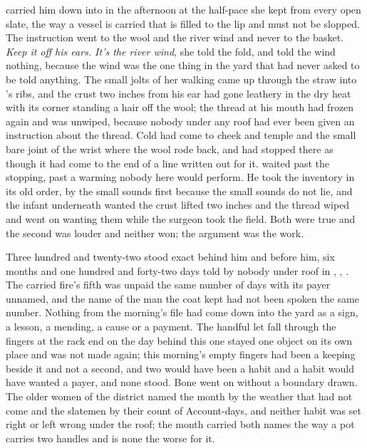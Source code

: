  carried him down into  in the afternoon at the half-pace she kept from every open slate, the way a vessel is carried that is filled to the lip and must not be slopped. The instruction went to the wool and the river wind and never to the basket. \emph{Keep it off his ears. It's the river wind}, she told the fold, and told the wind nothing, because the wind was the one thing in the yard that had never asked to be told anything. The small jolts of her walking came up through the straw into 's ribs, and the crust two inches from his ear had gone leathery in the dry heat with its corner standing a hair off the wool; the thread at his mouth had frozen again and was unwiped, because nobody under any roof had ever been given an instruction about the thread. Cold had come to cheek and temple and the small bare joint of the wrist where the wool rode back, and had stopped there as though it had come to the end of a line written out for it.  waited past the stopping, past a warming nobody here would perform. He took the inventory in its old order, by the small sounds first because the small sounds do not lie, and the infant underneath wanted the crust lifted two inches and the thread wiped and went on wanting them while the surgeon took the field. Both were true and the second was louder and neither won; the argument was the work.

Three hundred and twenty-two stood exact behind him and before him, six months and one hundred and forty-two days told by nobody under  roof in , , . The carried fire's fifth was unpaid the same number of days with its payer unnamed, and the name of the man the coat kept had not been spoken the same number. Nothing from the morning's file had come down into the yard as a sign, a lesson, a mending, a cause or a payment. The handful let fall through the fingers at the rack end on the day behind this one stayed one object on its own place and was not made again; this morning's empty fingers had been a keeping beside it and not a second, and two would have been a habit and a habit would have wanted a payer, and none stood. Bone went on without a boundary drawn. The older women of the district named the month by the weather that had not come and the slatemen by their count of Account-days, and neither habit was set right or left wrong under the roof; the month carried both names the way a pot carries two handles and is none the worse for it.

